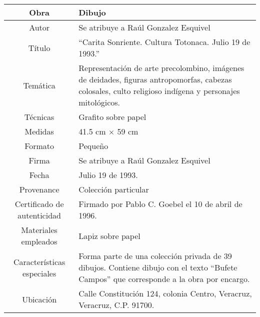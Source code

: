 \begin{table}[H]
\centering
\begin{tabular}{|c|m{}|}
\hline
Obra& Dibujo	\\
\hline
Autor & Se atribuye a Ra\'ul Gonzalez Esquivel\\
\hline
T\'itulo & ``Carita Sonriente. Cultura Totonaca. Julio 19 de 1993.'' \\
\hline
Tem\'atica & Representaci\'on de arte precolombino, im\'agenes de deidades, figuras antropomorfas, cabezas colosales, culto religioso ind\'igena y personajes mitol\'ogicos.\\
\hline
T\'ecnicas &Grafito sobre papel \\
\hline
Medidas & 41.5 cm $\times$ 59 cm \\
\hline
 Formato & Peque\~no \\
 \hline
 Firma & Se atribuye a Ra\'ul Gonzalez Esquivel\\ 
 \hline
  Fecha & Julio 19 de 1993.\\
 \hline
 Provenance & Colecci\'on particular\\
 \hline
 Certificado de autenticidad& Firmado por Pablo C. Goebel el 10 de abril de 1996.  \\
 \hline 
  Materiales empleados & Lapiz sobre papel\\
 \hline
 Caracter\'isticas especiales & Forma parte de una colecci\'on privada de 39 dibujos. 
Contiene dibujo con el texto ``Bufete Campos'' que corresponde a la obra por encargo. \\
\hline 
Ubicaci\'on & Calle Constituci\'on 124, colonia Centro, Veracruz, Veracruz, C.P. 91700.\\
\hline

\end{tabular}
\end{table}

